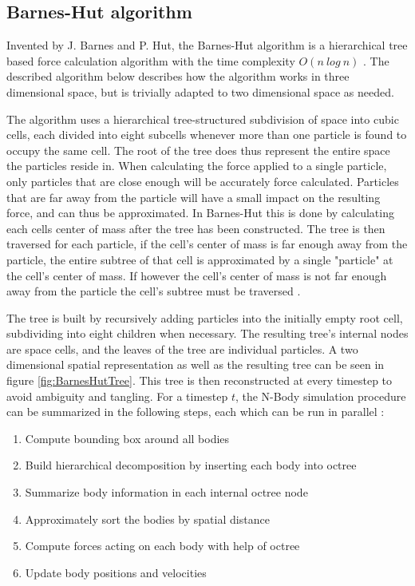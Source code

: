 \subsection{Barnes-Hut algorithm} \label{subsec:BarnesHut}
Invented by J. Barnes and P. Hut, the Barnes-Hut algorithm is a hierarchical tree based force calculation algorithm with the time complexity $O(n \ log \ n)$ \cite{barnes1986hierarchical}. The described algorithm below describes how the algorithm works in three dimensional space, but is trivially adapted to two dimensional space as needed. 

The algorithm uses a hierarchical tree-structured subdivision of space into cubic cells, each divided into eight subcells whenever more than one particle is found to occupy the same cell. The root of the tree does thus represent the entire space the particles reside in. When calculating the force applied to a single particle, only particles that are close enough will be accurately force calculated. Particles that are far away from the particle will have a small impact on the resulting force, and can thus be approximated. In Barnes-Hut this is done by calculating each cells center of mass after the tree has been constructed. The tree is then traversed for each particle, if the cell's center of mass is far enough away from the particle, the entire subtree of that cell is approximated by a single "particle" at the cell's center of mass. If however the cell's center of mass is not far enough away from the particle the cell's subtree must be traversed \cite{singh1995load}. 


The tree is built by recursively adding particles into the initially empty root cell, subdividing into eight children when necessary. The resulting tree's internal nodes are space cells, and the leaves of the tree are individual particles. A two dimensional spatial representation as well as the resulting tree can be seen in figure \ref{fig:BarnesHutTree}. 
This tree is then reconstructed at every timestep to avoid ambiguity and tangling. For a timestep $t$, the N-Body simulation procedure can be summarized in the following steps, each which can be run in parallel \cite{burtscher2011efficient}:

\begin{enumerate}
    \item Compute bounding box around all bodies
    \item Build hierarchical decomposition by inserting each body into octree
    \item Summarize body information in each internal octree node
    \item Approximately sort the bodies by spatial distance
    \item Compute forces acting on each body with help of octree
    \item Update body positions and velocities
\end{enumerate}


